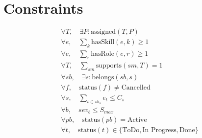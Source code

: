 \documentclass{article}
\begin{document}
\section*{Constraints}
\begin{align}
& \forall T, \quad \exists P : \text{assigned}(T,P) \tag{Team assigned to at least one project} \\
& \forall e, \quad \sum_{k} \text{hasSkill}(e,k) \geq 1 \tag{Employee has at least one skill} \\
& \forall e, \quad \sum_{r} \text{hasRole}(e,r) \geq 1 \tag{Employee has at least one role} \\
& \forall T, \quad \sum_{sm} \text{supports}(sm,T) = 1 \tag{One Scrum Master per team} \\
& \forall sb, \quad \exists s : \text{belongs}(sb,s) \tag{Sprint backlog belongs to sprint} \\
& \forall f, \quad \text{status}(f) \neq \text{Cancelled} \tag{Feature status restriction} \\
& \forall s, \quad \sum_{t \in sb_s} e_t \leq C_s \tag{Task effort within sprint capacity} \\
& \forall b, \quad sev_b \leq S_{max} \tag{Blocker severity limit} \\
& \forall pb, \quad \text{status}(pb) = \text{Active} \tag{Active product backlog} \\
& \forall t, \quad \text{status}(t) \in \{\text{ToDo}, \text{In Progress}, \text{Done}\} \tag{Allowed task statuses}
\end{align}
\end{document}
